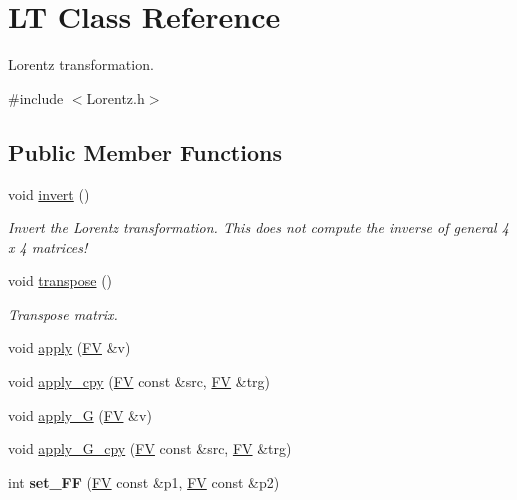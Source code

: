 \hypertarget{classLT}{}\section{L\+T Class Reference}
\label{classLT}


Lorentz transformation.  




{\ttfamily \#include $<$Lorentz.\+h$>$}

\subsection*{Public Member Functions}
\begin{DoxyCompactItemize}
\item 
\hypertarget{classLT_a7467f60d847896710f21c17be6ee0b2c}{}void \hyperlink{classLT_a7467f60d847896710f21c17be6ee0b2c}{invert} ()\label{classLT_a7467f60d847896710f21c17be6ee0b2c}

\begin{DoxyCompactList}\small\item\em Invert the Lorentz transformation. This does not compute the inverse of general 4 x 4 matrices! \end{DoxyCompactList}\item 
\hypertarget{classLT_a6142dba94f0edc4eb2f8a0cc84a43ada}{}void \hyperlink{classLT_a6142dba94f0edc4eb2f8a0cc84a43ada}{transpose} ()\label{classLT_a6142dba94f0edc4eb2f8a0cc84a43ada}

\begin{DoxyCompactList}\small\item\em Transpose matrix. \end{DoxyCompactList}\item 
void \hyperlink{classLT_a3119b968c2cf6a9bbfb30615c01921d0}{apply} (\hyperlink{classFV}{F\+V} \&v)
\item 
void \hyperlink{classLT_a7b58536df2aa3532e6d6055b5ce35e44}{apply\+\_\+cpy} (\hyperlink{classFV}{F\+V} const \&src, \hyperlink{classFV}{F\+V} \&trg)
\item 
void \hyperlink{classLT_abd17d410a8436a83b03f2dd2909ee59a}{apply\+\_\+\+G} (\hyperlink{classFV}{F\+V} \&v)
\item 
void \hyperlink{classLT_a1fbe2f64d6edc4378b7418eab68cfca0}{apply\+\_\+\+G\+\_\+cpy} (\hyperlink{classFV}{F\+V} const \&src, \hyperlink{classFV}{F\+V} \&trg)
\item 
\hypertarget{classLT_acdccba2ab08b071219626bafb85f8e21}{}int {\bfseries set\+\_\+\+F\+F} (\hyperlink{classFV}{F\+V} const \&p1, \hyperlink{classFV}{F\+V} const \&p2)\label{classLT_acdccba2ab08b071219626bafb85f8e21}


\end{DoxyCompactItemize}
